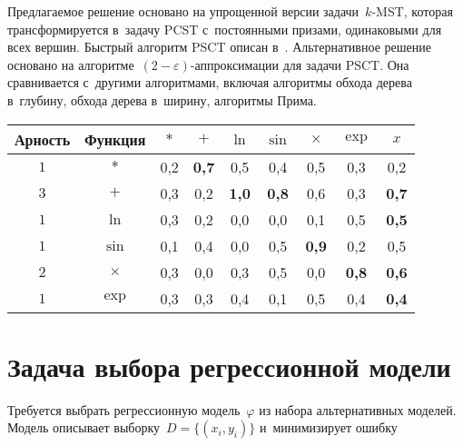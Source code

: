 \begin{multicols}{2}
Предлагаемое решение основано на упрощенной версии задачи~$k$-MST, которая 
трансформируется в~задачу PCST с~постоянными призами, одинаковыми для всех 
вершин. Быст\-рый алгоритм PSCT описан в~\cite{hegde2014fast}. Альтернативное 
решение основано на алгоритме~$(2-\varepsilon)$-аппроксимации для задачи PSCT. 
Она сравнивается с~другими алгоритмами, включая алгоритмы обхода дерева в~глубину, обхода дерева в~ширину, алгоритмы Прима.

\begin{table*}[b]\small  %
\vspace*{-12pt}
\begin{center}
        \parbox{262pt}{

}
    \label{restored_adjacency_matrix}
\vspace*{2ex}

        \begin{tabular}{|c|c|ccccccc|}
            \hline
            Арность&Функция&$\ast$&$+$&$\ln$&$\sin$&$\times$&$\exp$&$x$\\
            \hline
            $1$&$\ast$ &0,2&{\bf 0,7}&0,5&0,4&0,5&0,3&0,2\\
            $3$&$+$    &0,3&0,2&{\bf 1,0}&{\bf 0,8}&0,6&0,3&{\bf 0,7}\\
            $1$&$\ln$  &0,3&0,2&0,0&0,0&0,1&0,5&{\bf 0,5}\\
            $1$&$\sin$ &0,1&0,4&0,0&0,5&{\bf 0,9}&0,2&0,5\\
            $2$&$\times$&0,3&0,0&0,3&0,5&0,0&{\bf 0,8}&{\bf 0,6}\\
            $1$&$\exp$ &0,3&0,3&0,4&0,1&0,5&0,4&{\bf 0,4}\\
            \hline
        \end{tabular}
\end{center}
\end{table*}

\vspace*{-12pt}


\section{Задача выбора регрессионной модели}

\vspace*{-3pt}

Требуется выбрать регрессионную модель~$\varphi$ из набора альтернативных 
моделей. Модель описывает выборку~$D=\{(x_i,y_i)\}$ и~минимизирует ошибку


\end{multicols}
